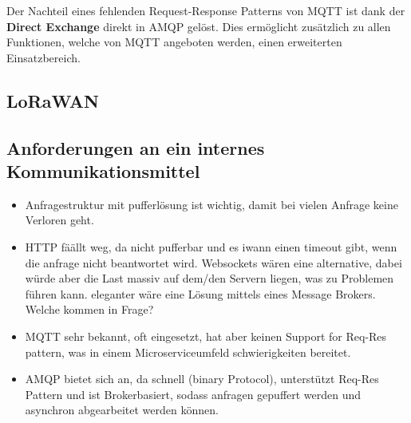 Der Nachteil eines fehlenden Request-Response Patterns von \ac{MQTT} ist dank der \textbf{Direct Exchange} direkt in \ac{AMQP} gelöst. Dies ermöglicht zusätzlich zu allen Funktionen, welche von \ac{MQTT} angeboten werden, einen erweiterten Einsatzbereich.

\subsection{LoRaWAN}
\subsection{Anforderungen an ein internes Kommunikationsmittel}

\begin{itemize}
    \item Anfragestruktur mit pufferlösung ist wichtig, damit bei vielen Anfrage keine Verloren geht.
    \item HTTP fäällt weg, da nicht pufferbar und es iwann einen timeout gibt, wenn die anfrage nicht beantwortet wird. Websockets wären eine alternative, dabei würde aber die Last massiv auf dem/den Servern liegen, was zu Problemen führen kann. eleganter wäre eine Lösung mittels eines Message Brokers. Welche kommen in Frage?
    \item MQTT sehr bekannt, oft eingesetzt, hat aber keinen Support for Req-Res pattern, was in einem Microserviceumfeld schwierigkeiten bereitet.
    \item AMQP bietet sich an, da schnell (binary Protocol), unterstützt Req-Res Pattern und ist Brokerbasiert, sodass anfragen gepuffert werden und asynchron abgearbeitet werden können.
\end{itemize}

